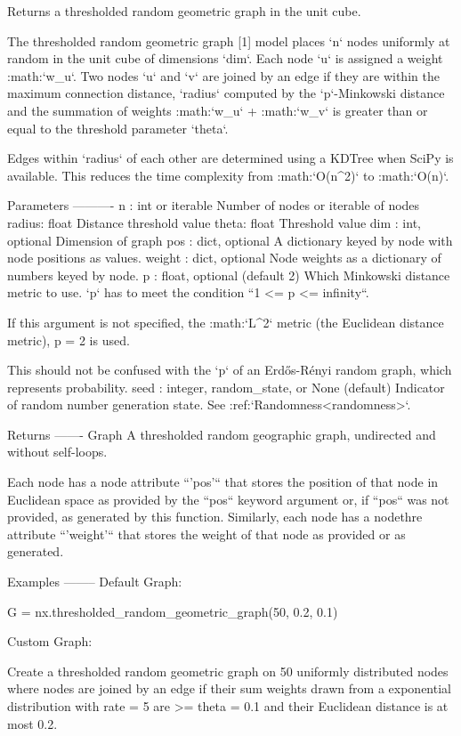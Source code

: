 \begin{DoxyVerb}Returns a thresholded random geometric graph in the unit cube.

The thresholded random geometric graph [1] model places `n` nodes
uniformly at random in the unit cube of dimensions `dim`. Each node
`u` is assigned a weight :math:`w_u`. Two nodes `u` and `v` are
joined by an edge if they are within the maximum connection distance,
`radius` computed by the `p`-Minkowski distance and the summation of
weights :math:`w_u` + :math:`w_v` is greater than or equal
to the threshold parameter `theta`.

Edges within `radius` of each other are determined using a KDTree when
SciPy is available. This reduces the time complexity from :math:`O(n^2)`
to :math:`O(n)`.

Parameters
----------
n : int or iterable
    Number of nodes or iterable of nodes
radius: float
    Distance threshold value
theta: float
    Threshold value
dim : int, optional
    Dimension of graph
pos : dict, optional
    A dictionary keyed by node with node positions as values.
weight : dict, optional
    Node weights as a dictionary of numbers keyed by node.
p : float, optional (default 2)
    Which Minkowski distance metric to use.  `p` has to meet the condition
    ``1 <= p <= infinity``.

    If this argument is not specified, the :math:`L^2` metric
    (the Euclidean distance metric), p = 2 is used.

    This should not be confused with the `p` of an Erdős-Rényi random
    graph, which represents probability.
seed : integer, random_state, or None (default)
    Indicator of random number generation state.
    See :ref:`Randomness<randomness>`.

Returns
-------
Graph
    A thresholded random geographic graph, undirected and without
    self-loops.

    Each node has a node attribute ``'pos'`` that stores the
    position of that node in Euclidean space as provided by the
    ``pos`` keyword argument or, if ``pos`` was not provided, as
    generated by this function. Similarly, each node has a nodethre
    attribute ``'weight'`` that stores the weight of that node as
    provided or as generated.

Examples
--------
Default Graph:

G = nx.thresholded_random_geometric_graph(50, 0.2, 0.1)

Custom Graph:

Create a thresholded random geometric graph on 50 uniformly distributed
nodes where nodes are joined by an edge if their sum weights drawn from
a exponential distribution with rate = 5 are >= theta = 0.1 and their
Euclidean distance is at most 0.2.


\end{DoxyVerb}
